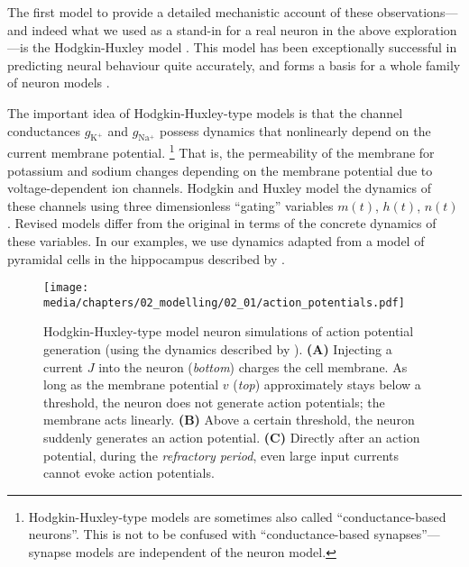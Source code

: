 \vspace*{-0.25em}
The first model to provide a detailed mechanistic account of these observations---and indeed what we used as a stand-in for a real neuron in the above exploration---is the Hodgkin-Huxley model \citep{hodgkin1952quantitative}.
This model has been exceptionally successful in predicting neural behaviour quite accurately, and forms a basis for a whole family of neuron models \citep{meunier2002playing,mccormick2007hodgkin}.

The important idea of Hodgkin-Huxley-type models is that the channel conductances $g_\mathrm{K^+}$ and $g_\mathrm{Na^+}$ possess dynamics that nonlinearly depend on the current membrane potential.%
\footnote{Hodgkin-Huxley-type models are sometimes also called \enquote{conductance-based neurons}. This is not to be confused with \enquote{conductance-based synapses}---synapse models are independent of the neuron model.}
That is, the permeability of the membrane for potassium and sodium changes depending on the membrane potential due to voltage-dependent ion channels.
Hodgkin and Huxley model the dynamics of these channels using three dimensionless \enquote{gating} variables $m(t)$, $h(t)$, $n(t)$.
Revised models differ from the original in terms of the concrete dynamics of these variables.
In our examples, we use dynamics adapted from a model of pyramidal cells in the hippocampus described by \citet[Chapter~4, pp.~92-94]{traub1991neuronal}.

\begin{figure}[p]
	\texttt{[image: media/chapters/02\_modelling/02\_01/action\_potentials.pdf]}
	{\label{fig:action_potentials_subthreshold}}
	{\label{fig:action_potentials_superthreshold}}
	{\label{fig:action_potentials_refractory}}
	\caption[Hodgkin-Huxley-type model neuron simulations of action potential generation]{Hodgkin-Huxley-type model neuron simulations of action potential generation (using the dynamics described by \cite{traub1991neuronal}).
	\textbf{(A)} Injecting a current $J$ into the neuron (\emph{bottom}) charges the cell membrane. As long as the membrane potential $v$ (\emph{top}) approximately stays below a threshold, the neuron does not generate action potentials; the membrane acts linearly. \textbf{(B)} Above a certain threshold, the neuron suddenly generates an action potential. \textbf{(C)} Directly after an action potential, during the \emph{refractory period}, even large input currents cannot evoke action potentials.}
\end{figure}

